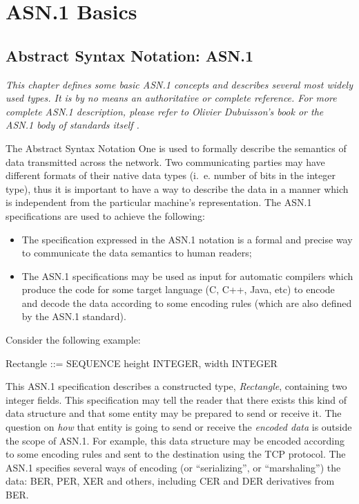 \documentclass[english,oneside,12pt]{book}
\begin{document}
\part{\label{par:ASN.1-Basics}ASN.1 Basics}


\chapter{\label{cha:Abstract-Syntax-Notation:}Abstract Syntax Notation: ASN.1}

\emph{This chapter defines some basic ASN.1 concepts and describes
several most widely used types. It is by no means an authoritative
or complete reference. For more complete ASN.1 description, please
refer to Olivier Dubuisson's book \cite{Dub00} or the ASN.1 body
of standards itself \cite{ITU-T/ASN.1}.}

The Abstract Syntax Notation One is used to formally describe the
semantics of data transmitted across the network. Two communicating
parties may have different formats of their native data types (i.~e.
number of bits in the integer type), thus it is important to have
a way to describe the data in a manner which is independent from the
particular machine's representation. The ASN.1 specifications are
used to achieve the following:
\begin{itemize}
\item The specification expressed in the ASN.1 notation is a formal and
precise way to communicate the data semantics to human readers;
\item The ASN.1 specifications may be used as input for automatic compilers
which produce the code for some target language (C, C++, Java, etc)
to encode and decode the data according to some encoding rules (which
are also defined by the ASN.1 standard).
\end{itemize}
Consider the following example:
\begin{asn}
Rectangle ::= SEQUENCE {
    height  INTEGER,
    width   INTEGER
}
\end{asn}
This ASN.1 specification describes a constructed type, \emph{Rectangle},
containing two integer fields. This specification may tell the reader
that there exists this kind of data structure and that some entity
may be prepared to send or receive it. The question on \emph{how}
that entity is going to send or receive the \emph{encoded data} is
outside the scope of ASN.1. For example, this data structure may be
encoded according to some encoding rules and sent to the destination
using the TCP protocol. The ASN.1 specifies several ways of encoding
(or ``serializing'', or ``marshaling'') the data: BER, PER, XER
and others, including CER and DER derivatives from BER.
\end{document}
